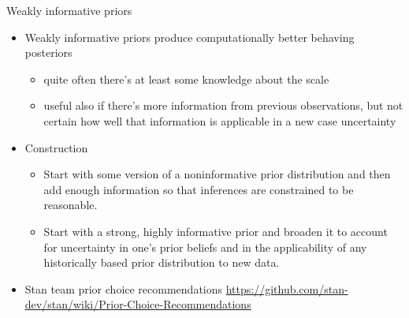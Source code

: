 \documentclass[english,t]{beamer}
\DeclareMathOperator{\Beta}{Beta}
\begin{document}





\begin{frame}{Weakly informative priors}

  \begin{itemize}
  \item Weakly informative priors produce computationally better
    behaving posteriors
    \begin{itemize}
    \item quite often there's at least some knowledge about the
      scale
    \item useful also if there's more information from previous
      observations, but not certain how well that information is
      applicable in a new case uncertainty
    \end{itemize}
    \pause
  \item Construction
    \begin{itemize}
    \item Start with some version of a noninformative prior distribution and then add enough
      information so that inferences are constrained to be reasonable.
    \item Start with a strong, highly informative prior and broaden it to account for uncertainty
      in one's prior beliefs and in the applicability of any historically based prior distribution
      to new data.
    \end{itemize}
  \item Stan team prior choice recommendations \url{https://github.com/stan-dev/stan/wiki/Prior-Choice-Recommendations}
  \end{itemize}

\end{frame}
\end{document}
